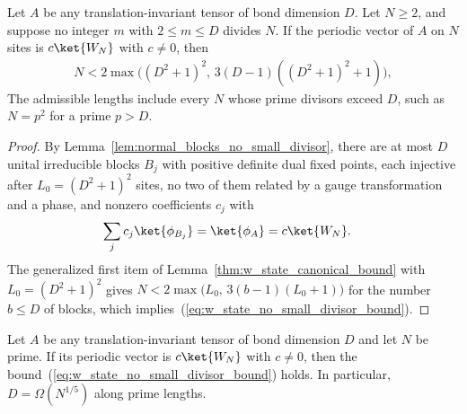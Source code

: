 \begin{lemma}%
    \label{thm:w_state_no_small_divisor_bound}
    \leanok
    Let $A$ be any translation-invariant tensor of bond dimension $D$. Let
    $N\geq2$, and suppose no integer $m$ with $2\leq m\leq D$ divides $N$. If the periodic vector of $A$ on $N$ sites is $c\ket{W_N}$ with
    $c\neq0$, then
    \begin{align}
        N<2\max\bigl((D^2+1)^2,\,3(D-1)((D^2+1)^2+1)\bigr),
        \label{eq:w_state_no_small_divisor_bound}
    \end{align}
    The admissible lengths include every $N$ whose prime divisors exceed $D$,
    such as $N=p^2$ for a prime $p>D$.
\end{lemma}

\begin{proof}
    \leanok
    By Lemma~\ref{lem:normal_blocks_no_small_divisor}, there are at most $D$
    unital irreducible blocks $B_j$ with positive definite dual fixed points,
    each injective after $L_0=(D^2+1)^2$ sites, no two of them related by a
    gauge transformation and a phase, and nonzero coefficients $c_j$ with
    \begin{align}
        \sum_jc_j\ket{\phi_{B_j}} & =\ket{\phi_A}=c\ket{W_N}.
    \end{align}
    The generalized first item of
    Lemma~\ref{thm:w_state_canonical_bound} with $L_0=(D^2+1)^2$ gives
    $N<2\max\bigl(L_0,\,3(b-1)(L_0+1)\bigr)$ for the number $b\le D$ of
    blocks, which implies~(\ref{eq:w_state_no_small_divisor_bound}).
\end{proof}

\begin{lemma}%
    \label{thm:w_state_prime_bound}
    \leanok
    Let $A$ be any translation-invariant tensor of bond dimension $D$ and let
    $N$ be prime. If its periodic vector is $c\ket{W_N}$ with $c\neq0$, then
    the bound~(\ref{eq:w_state_no_small_divisor_bound}) holds. In particular,
    $D=\Omega(N^{1/5})$ along prime lengths.
\end{lemma}


